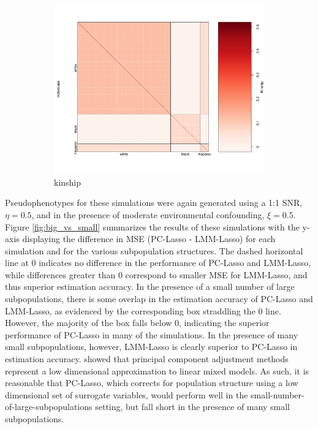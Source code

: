 \begin{figure}[H]
\begin{subfigure}{.8\textwidth}
  \centering
  \includegraphics[width=.7\linewidth]{figures/vanderwas_kinship.pdf}  
  \caption{ kinship}
  \label{fig:vandy_groups}
\end{subfigure}
\caption{}
\label{fig:kinship}
\end{figure}


Pseudophenotypes for these simulations were again generated using a 1:1 SNR, $\eta = 0.5$, and in the presence of moderate environmental confounding, $\xi = 0.5$. Figure \ref{fig:big_vs_small} summarizes the results of these simulations with the y-axis displaying the difference in MSE (PC-Lasso - LMM-Lasso) for each simulation and for the various subpopulation structures. The dashed horizontal line at 0 indicates no difference in the performance of PC-Lasso and LMM-Lasso, while differences greater than 0 correspond to smaller MSE for LMM-Lasso, and thus superior estimation accuracy. In the presence of a small number of large subpopulations, there is some overlap in the estimation accuracy of PC-Lasso and LMM-Lasso, as evidenced by the corresponding box straddling the 0 line. However, the majority of the box falls below 0, indicating the superior performance of PC-Lasso in many of the simulations. In the presence of many small subpopulations, however, LMM-Lasso is clearly superior to PC-Lasso in estimation accuracy. \cite{hoffman2013correcting} showed that principal component adjustment methods represent a low dimensional approximation to linear mixed models. As such, it is reasonable that PC-Lasso, which corrects for population structure using a low dimensional set of surrogate variables, would perform well in the small-number-of-large-subpopulations setting, but fall short in the presence of many small subpopulations. \\

